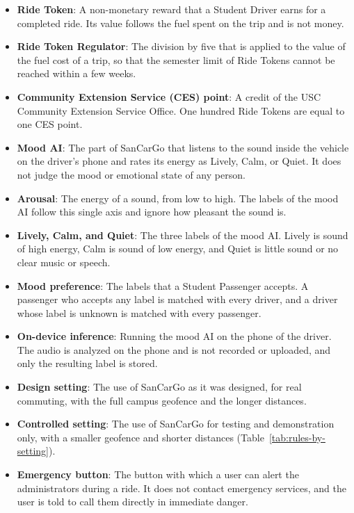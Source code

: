 \begin{itemize}
    \item \textbf{Ride Token}: A non-monetary reward that a Student Driver earns for a completed ride. Its value follows the fuel spent on the trip and is not money.
    \item \textbf{Ride Token Regulator}: The division by five that is applied to the value of the fuel cost of a trip, so that the semester limit of Ride Tokens cannot be reached within a few weeks.
    \item \textbf{Community Extension Service (CES) point}: A credit of the USC Community Extension Service Office. One hundred Ride Tokens are equal to one CES point.
    \item \textbf{Mood AI}: The part of SanCarGo that listens to the sound inside the vehicle on the driver's phone and rates its energy as Lively, Calm, or Quiet. It does not judge the mood or emotional state of any person.
    \item \textbf{Arousal}: The energy of a sound, from low to high. The labels of the mood AI follow this single axis and ignore how pleasant the sound is.
    \item \textbf{Lively, Calm, and Quiet}: The three labels of the mood AI. Lively is sound of high energy, Calm is sound of low energy, and Quiet is little sound or no clear music or speech.
    \item \textbf{Mood preference}: The labels that a Student Passenger accepts. A passenger who accepts any label is matched with every driver, and a driver whose label is unknown is matched with every passenger.
    \item \textbf{On-device inference}: Running the mood AI on the phone of the driver. The audio is analyzed on the phone and is not recorded or uploaded, and only the resulting label is stored.
    \item \textbf{Design setting}: The use of SanCarGo as it was designed, for real commuting, with the full campus geofence and the longer distances.
    \item \textbf{Controlled setting}: The use of SanCarGo for testing and demonstration only, with a smaller geofence and shorter distances (Table~\ref{tab:rules-by-setting}).
    \item \textbf{Emergency button}: The button with which a user can alert the administrators during a ride. It does not contact emergency services, and the user is told to call them directly in immediate danger.
\end{itemize}
